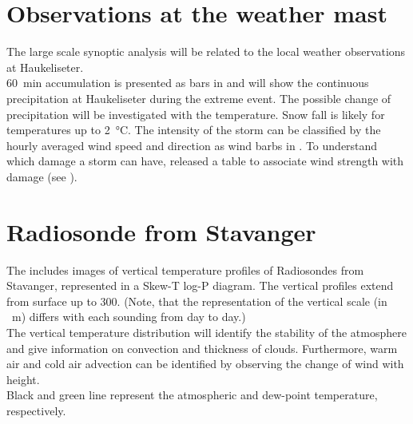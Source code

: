 \section{Observations at the weather mast}
\label{sec:loc_obs}
The large scale synoptic analysis will be related to the local weather  observations at Haukeliseter. 
\\
\SI{60}{\minute} accumulation is presented as bars in  and will show the continuous precipitation at Haukeliseter during the extreme event. The possible change of precipitation will be investigated with the temperature. Snow fall is likely for temperatures up to \SI{2}{\celsius}. The intensity of the storm can be classified by the hourly averaged wind speed and direction as wind barbs in \SI{}{\mPs}.
To understand which damage a storm can have, \cite{faeraas_urd_2016} released a table to associate wind strength with damage (see ).


\newpage

\section{Radiosonde from Stavanger} \label{sec:Radiosonde}
The  includes images of vertical temperature profiles of Radiosondes from Stavanger, represented in a Skew-T log-P diagram. The vertical profiles extend from surface up to \SI{300}{\hPa}. (Note, that the representation of the vertical scale (in \SI{}{\metre}) differs with each sounding from day to day.)
\\
The vertical temperature distribution will identify the stability of the atmosphere and give information on convection and thickness of clouds. Furthermore, warm air and cold air advection can be identified by observing the change of wind with height.
\\
Black and green line represent the atmospheric and dew-point temperature, respectively.

